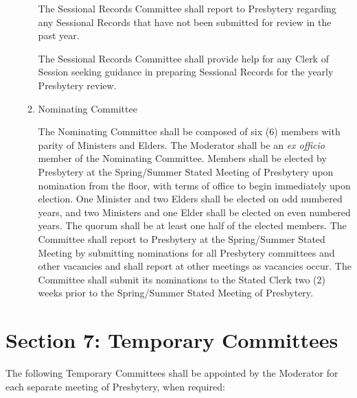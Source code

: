 \documentclass[
]{book}
\begin{document}
\begin{enumerate}
\begin{enumerate}
    The Sessional Records Committee shall report to Presbytery regarding any Sessional Records that have not been submitted for review in the past year.

    The Sessional Records Committee shall provide help for any Clerk of Session seeking guidance in preparing Sessional Records for the yearly Presbytery review.
  \item
    Nominating Committee

    The Nominating Committee shall be composed of six (6) members with parity of Ministers and Elders. The Moderator shall be an \emph{ex officio} member of the Nominating Committee. Members shall be elected by Presbytery at the Spring/Summer Stated Meeting of Presbytery upon nomination from the floor, with terms of office to begin immediately upon election. One Minister and two Elders shall be elected on odd numbered years, and two Ministers and one Elder shall be elected on even numbered years. The quorum shall be at least one half of the elected members. The Committee shall report to Presbytery at the Spring/Summer Stated Meeting by submitting nominations for all Presbytery committees and other vacancies and shall report at other meetings as vacancies occur. The Committee shall submit its nominations to the Stated Clerk two (2) weeks prior to the Spring/Summer Stated Meeting of Presbytery.
  \end{enumerate}
\end{enumerate}

\hypertarget{section-7-temporary-committees}{%
\section{Section 7: Temporary Committees}\label{section-7-temporary-committees}}

The following Temporary Committees shall be appointed by the Moderator for each separate meeting of Presbytery, when required:
\end{document}
